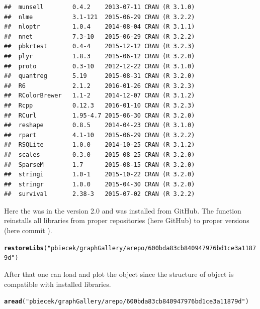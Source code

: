 \documentclass[nojss]{jss}\usepackage[]{graphicx}\usepackage[]{color}
\makeatletter
\newcommand{\hlstr}[1]{\textcolor[rgb]{0.192,0.494,0.8}{#1}}%
\newcommand{\hlstd}[1]{\textcolor[rgb]{0.345,0.345,0.345}{#1}}%
\newcommand{\hlkwd}[1]{\textcolor[rgb]{0.737,0.353,0.396}{\textbf{#1}}}%
\newenvironment{kframe}{%
 \def\at@end@of@kframe{}%
 \ifinner\ifhmode%
  \def\at@end@of@kframe{\end{minipage}}%
  \begin{minipage}{\columnwidth}%
 \fi\fi%
 \def\FrameCommand##1{\hskip\@totalleftmargin \hskip-\fboxsep
 \colorbox{shadecolor}{##1}\hskip-\fboxsep
     \hskip-\linewidth \hskip-\@totalleftmargin \hskip\columnwidth}%
 \MakeFramed {\advance\hsize-\width
   \@totalleftmargin\z@ \linewidth\hsize
   \@setminipage}}%
 {\par\unskip\endMakeFramed%
 \at@end@of@kframe}
\newenvironment{knitrout}{}{} %
\makeatother
\begin{document}
\begin{knitrout}
\begin{kframe}
\begin{verbatim}
##  munsell        0.4.2    2013-07-11 CRAN (R 3.1.0)                 
##  nlme           3.1-121  2015-06-29 CRAN (R 3.2.2)                 
##  nloptr         1.0.4    2014-08-04 CRAN (R 3.1.1)                 
##  nnet           7.3-10   2015-06-29 CRAN (R 3.2.2)                 
##  pbkrtest       0.4-4    2015-12-12 CRAN (R 3.2.3)                 
##  plyr           1.8.3    2015-06-12 CRAN (R 3.2.0)                 
##  proto          0.3-10   2012-12-22 CRAN (R 3.1.0)                 
##  quantreg       5.19     2015-08-31 CRAN (R 3.2.0)                 
##  R6             2.1.2    2016-01-26 CRAN (R 3.2.3)                 
##  RColorBrewer   1.1-2    2014-12-07 CRAN (R 3.1.2)                 
##  Rcpp           0.12.3   2016-01-10 CRAN (R 3.2.3)                 
##  RCurl          1.95-4.7 2015-06-30 CRAN (R 3.2.0)                 
##  reshape        0.8.5    2014-04-23 CRAN (R 3.1.0)                 
##  rpart          4.1-10   2015-06-29 CRAN (R 3.2.2)                 
##  RSQLite        1.0.0    2014-10-25 CRAN (R 3.1.2)                 
##  scales         0.3.0    2015-08-25 CRAN (R 3.2.0)                 
##  SparseM        1.7      2015-08-15 CRAN (R 3.2.0)                 
##  stringi        1.0-1    2015-10-22 CRAN (R 3.2.0)                 
##  stringr        1.0.0    2015-04-30 CRAN (R 3.2.0)                 
##  survival       2.38-3   2015-07-02 CRAN (R 3.2.2)
\end{verbatim}
\end{kframe}
\end{knitrout}


Here the  was in the version 2.0 and was installed from GitHub. The  function reinstalls all libraries from proper repositories (here GitHub) to proper versions (here commit ).

\begin{knitrout}
\color{fgcolor}\begin{kframe}
\begin{alltt}
\hlkwd{restoreLibs}\hlstd{(}\hlstr{"pbiecek/graphGallery/arepo/600bda83cb840947976bd1ce3a11879d"}\hlstd{)}
\end{alltt}
\end{kframe}
\end{knitrout}


After that one can load and plot the  object since the structure of  object is compatible with installed libraries.

\begin{knitrout}
\color{fgcolor}\begin{kframe}
\begin{alltt}
\hlkwd{aread}\hlstd{(}\hlstr{"pbiecek/graphGallery/arepo/600bda83cb840947976bd1ce3a11879d"}\hlstd{)}
\end{alltt}
\end{kframe}
\end{knitrout}
\end{document}

